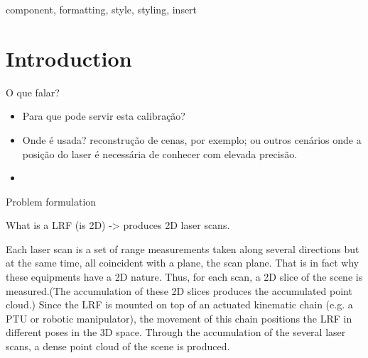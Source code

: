 \documentclass[conference]{IEEEtran}
\begin{document}
\begin{abstract}
\dots
\end{abstract}

\begin{IEEEkeywords}
component, formatting, style, styling, insert
\end{IEEEkeywords}

\section{Introduction}\label{sec:introduction}



O que falar?
\begin{itemize}
    \item Para que pode servir esta calibração?
    \item Onde é usada? reconstrução de cenas, por exemplo; ou outros cenários onde a posição do laser é necessária de conhecer com elevada precisão.
    \item 
\end{itemize}

Problem formulation

What is a LRF (is 2D) -> produces 2D laser scans.





% 
%
Each laser scan is a set of range measurements taken along several directions but at the same time, all coincident with a plane, the scan plane. That is in fact why these equipments have  a 2D nature. Thus, for each scan, a 2D slice of the scene is measured.(The accumulation of these 2D slices produces the accumulated point cloud.) Since the LRF is mounted on top of an actuated kinematic chain (e.g. a PTU or robotic manipulator), the movement of this chain positions the LRF in different poses in the 3D space. Through the accumulation of the several laser scans, a dense point cloud of the scene is produced. 
\end{document}
